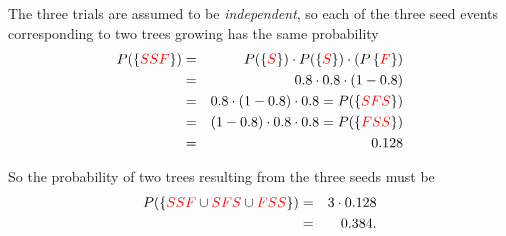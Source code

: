 \documentclass[smaller, handout]{beamer}\usepackage[]{graphicx}\usepackage[]{color}
\renewcommand{\Pr}{P}
\begin{document}
\begin{frame}{\secname}%


\begin{example}[continued]

The three trials are assumed to be \emph{independent}, so
each of the three seed events corresponding to two trees growing has
the same probability%
\begin{eqnarray*}
\Pr (\left\{
\color{red}%
SSF%
\color{black}%
\right\})  &=&\Pr (\left\{
\color{red}%
S%
\color{black}%
\right\}) \cdot \Pr (\left\{
\color{red}%
S%
\color{black}%
\right\} ) \cdot (\Pr \left\{
\color{red}%
F%
\color{black}%
\right\}  ) \\
&=&0.8\cdot 0.8\cdot (1-0.8) \\
&=&0.8\cdot (1-0.8)\cdot 0.8 =\Pr (\left\{
\color{red}%
SFS%
\color{black}%
\right\})  \\
&=&(1-0.8)\cdot 0.8\cdot 0.8= \Pr (\left\{
\color{red}%
FSS
\color{black}%
\right\} ) \\
&=&0.128
\end{eqnarray*}

So the probability of two trees resulting from the three seeds must be%
\begin{eqnarray*}
\Pr (\left\{
\color{red}%
SSF%
\color{black}%
\cup
\color{red}%
SFS%
\color{black}%
\cup
\color{red}%
FSS%
\color{black}%
\right\} ) &=&3\cdot 0.128 \\
&=&0.384.
\end{eqnarray*}

\end{example}



\end{frame}%
\end{document}
